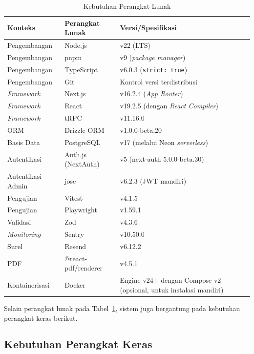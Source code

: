 \begin{table}[htbp]
  \centering
  \caption{Kebutuhan Perangkat Lunak}
  \label{tab:kebutuhan-software}
  \begin{tabularx}{\textwidth}{@{}l l X@{}}
    \toprule
    \textbf{Konteks} & \textbf{Perangkat Lunak} & \textbf{Versi/Spesifikasi} \\
    \midrule
    Pengembangan & Node.js & v22 (LTS) \\
    Pengembangan & pnpm & v9 (\textit{package manager}) \\
    Pengembangan & TypeScript & v6.0.3 (\texttt{strict: true}) \\
    Pengembangan & Git & Kontrol versi terdistribusi \\
    \textit{Framework} & Next.js & v16.2.4 (\textit{App Router}) \\
    \textit{Framework} & React & v19.2.5 (dengan \textit{React Compiler}) \\
    \textit{Framework} & tRPC & v11.16.0 \\
    ORM & Drizzle ORM & v1.0.0-beta.20 \\
    Basis Data & PostgreSQL & v17 (melalui Neon \textit{serverless}) \\
    Autentikasi & Auth.js (NextAuth) & v5 (next-auth 5.0.0-beta.30) \\
    Autentikasi Admin & jose & v6.2.3 (JWT mandiri) \\
    Pengujian & Vitest & v4.1.5 \\
    Pengujian & Playwright & v1.59.1 \\
    Validasi & Zod & v4.3.6 \\
    \textit{Monitoring} & Sentry & v10.50.0 \\
    Surel & Resend & v6.12.2 \\
    PDF & @react-pdf/renderer & v4.5.1 \\
    Kontainerisasi & Docker & Engine v24+ dengan Compose v2 (opsional, untuk instalasi mandiri) \\
    \bottomrule
  \end{tabularx}
\end{table}

Selain perangkat lunak pada Tabel~\ref{tab:kebutuhan-software}, sistem juga bergantung pada kebutuhan perangkat keras berikut.

\subsection{Kebutuhan Perangkat Keras}

